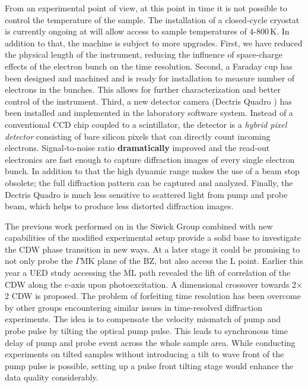 From an experimental point of view, at this point in time it is not possible to control the temperature of the sample.
The installation of a closed-cycle cryostat is currently ongoing at will allow access to sample temperatures of 4-800\,K.
In addition to that, the machine is subject to more upgrades.
First, we have reduced the physical length of the instrument, reducing the influence of space-charge effects of the electron bunch on the time resolution.
Second, a Faraday cup has been designed and machined and is ready for installation to measure number of electrons in the bunches.
This allows for further characterization and better control of the instrument.
Third, a new detector camera (Dectris Quadro \cite{dectris2022}) has been installed and implemented in the laboratory software system.
Instead of a conventional CCD chip coupled to a scintillator, the detector is a \emph{hybrid pixel detector} consisting of bare silicon pixels that can directly count incoming electrons.
Signal-to-noise ratio \textbf{dramatically} improved and the read-out electronics are fast enough to capture diffraction images of every single electron bunch.
In addition to that the high dynamic range makes the use of a beam stop obsolete; the full diffraction pattern can be captured and analyzed.
Finally, the Dectris Quadro is much less sensitive to scattered light from pump and probe beam, which helps to produce less distorted diffraction images.

The previous work performed on \ts\space in the Siwick Group combined with new capabilities of the modified experimental setup provide a solid base to investigate the \ac{CDW} phase transition in new ways.
At a later stage it could be promising to not only probe the $\Gamma\mathrm{MK}$ plane of the \ac{BZ}, but also access the L point.
Earlier this year a \ac{UED} study accessing the $\overline{\mathrm{ML}}$ path revealed the lift of correlation of the \ac{CDW} along the c-axis upon photoexcitation.
A dimensional crossover towards 2$\times$2 \ac{CDW} is proposed\cite{cheng2022}.
The problem of forfeiting time resolution has been overcome by other groups encountering similar issues in time-resolved diffraction experiments.
The idea is to compensate the velocity mismatch of pump and probe pulse by tilting the optical pump pulse.
This leads to synchronous time delay of pump and probe event across the whole sample area\cite{baum2006,zhou2013}.
While conducting experiments on tilted samples without introducing a tilt to wave front of the pump pulse is possible, setting up a pulse front tilting stage would enhance the data quality considerably.

